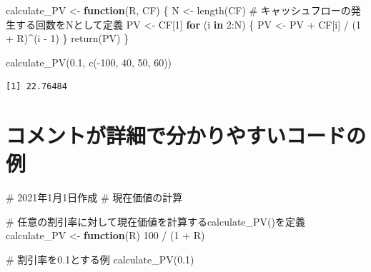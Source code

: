\documentclass[
  letterpaper,
  DIV=11,
  numbers=noendperiod]{scrreprt}
\newenvironment{Shaded}{\begin{snugshade}}{\end{snugshade}}
\newcommand{\CommentTok}[1]{\textcolor[rgb]{0.37,0.37,0.37}{#1}}
\newcommand{\ControlFlowTok}[1]{\textcolor[rgb]{0.00,0.23,0.31}{\textbf{#1}}}
\newcommand{\DecValTok}[1]{\textcolor[rgb]{0.68,0.00,0.00}{#1}}
\newcommand{\FloatTok}[1]{\textcolor[rgb]{0.68,0.00,0.00}{#1}}
\newcommand{\FunctionTok}[1]{\textcolor[rgb]{0.28,0.35,0.67}{#1}}
\newcommand{\NormalTok}[1]{\textcolor[rgb]{0.00,0.23,0.31}{#1}}
\newcommand{\OtherTok}[1]{\textcolor[rgb]{0.00,0.23,0.31}{#1}}
\newcommand{\SpecialCharTok}[1]{\textcolor[rgb]{0.37,0.37,0.37}{#1}}
\begin{document}
\begin{Shaded}
\begin{Highlighting}[]
\NormalTok{calculate\_PV }\OtherTok{\textless{}{-}} \ControlFlowTok{function}\NormalTok{(R, CF) \{}
\NormalTok{  N }\OtherTok{\textless{}{-}} \FunctionTok{length}\NormalTok{(CF) }\CommentTok{\# キャッシュフローの発生する回数をNとして定義}
\NormalTok{  PV }\OtherTok{\textless{}{-}}\NormalTok{ CF[}\DecValTok{1}\NormalTok{]}
  \ControlFlowTok{for}\NormalTok{ (i }\ControlFlowTok{in} \DecValTok{2}\SpecialCharTok{:}\NormalTok{N) \{}
\NormalTok{    PV }\OtherTok{\textless{}{-}}\NormalTok{ PV }\SpecialCharTok{+}\NormalTok{ CF[i] }\SpecialCharTok{/}\NormalTok{ (}\DecValTok{1} \SpecialCharTok{+}\NormalTok{ R)}\SpecialCharTok{\^{}}\NormalTok{(i }\SpecialCharTok{{-}} \DecValTok{1}\NormalTok{)}
\NormalTok{  \}}
  \FunctionTok{return}\NormalTok{(PV)}
\NormalTok{\}}

\FunctionTok{calculate\_PV}\NormalTok{(}\FloatTok{0.1}\NormalTok{, }\FunctionTok{c}\NormalTok{(}\SpecialCharTok{{-}}\DecValTok{100}\NormalTok{, }\DecValTok{40}\NormalTok{, }\DecValTok{50}\NormalTok{, }\DecValTok{60}\NormalTok{))}
\end{Highlighting}
\end{Shaded}

\begin{verbatim}
[1] 22.76484
\end{verbatim}

\section{コメントが詳細で分かりやすいコードの例}\label{ux30b3ux30e1ux30f3ux30c8ux304cux8a73ux7d30ux3067ux5206ux304bux308aux3084ux3059ux3044ux30b3ux30fcux30c9ux306eux4f8b}

\begin{Shaded}
\begin{Highlighting}[]
\CommentTok{\# 2021年1月1日作成}
\CommentTok{\# 現在価値の計算}

\CommentTok{\# 任意の割引率に対して現在価値を計算するcalculate\_PV()を定義}
\NormalTok{calculate\_PV }\OtherTok{\textless{}{-}} \ControlFlowTok{function}\NormalTok{(R) }\DecValTok{100} \SpecialCharTok{/}\NormalTok{ (}\DecValTok{1} \SpecialCharTok{+}\NormalTok{ R)}

\CommentTok{\# 割引率を0.1とする例}
\FunctionTok{calculate\_PV}\NormalTok{(}\FloatTok{0.1}\NormalTok{)}
\end{Highlighting}
\end{Shaded}
\end{document}
